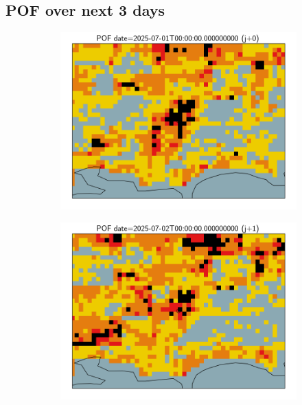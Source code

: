 \documentclass{article}
\begin{document}
\subsection*{POF over next 3 days}
\vspace{-1em}
\begin{figure}[H]
    \centering
    \begin{subfigure}[b]{0.31\textwidth}
        \centering
        \includegraphics[width=\linewidth]{pof_281_j0.png} %
    \end{subfigure}
    \begin{subfigure}[b]{0.31\textwidth}
        \centering
        \includegraphics[width=\linewidth]{pof_281_j1.png} %

\end{subfigure}
\end{figure}
\end{document}
